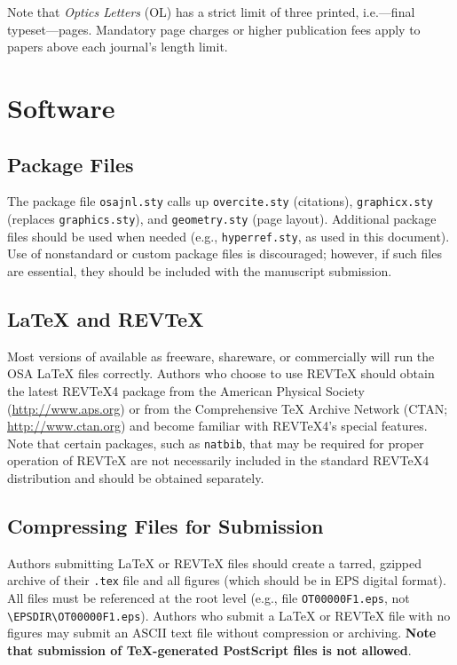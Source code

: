 \documentclass[letterpaper,12pt]{article}   %
\begin{document}
Note that \textit{Optics Letters} (OL) has a strict limit of
three printed, i.e.---final typeset---pages. Mandatory page
charges or higher publication fees apply to papers above each
journal's length limit.
\section{Software}
\subsection{Package Files}
The package file \texttt{osajnl.sty} calls up
\texttt{overcite.sty} (citations), \texttt{graphicx.sty} (replaces \texttt{graphics.sty}), and \texttt{geometry.sty} (page layout). Additional
package files should be used when needed (e.g.,
\texttt{hyperref.sty}, as used in this document). Use of
nonstandard or custom package files is discouraged; however, if
such files are essential, they should be included with the
manuscript submission.

\subsection{\LaTeX{} and REV\TeX} Most versions of \LaTeXe{}
available as freeware, shareware, or commercially will run the OSA
\LaTeX{} files correctly. Authors who choose to use REV\TeX{}
should obtain the latest REV\TeX{}4 package from the American
Physical Society (\url{http://www.aps.org}) or from the
Comprehensive \TeX{} Archive Network (CTAN;
\href{http://www.ctan.org}{http://www.ctan.org}) and become familiar with REV\TeX{}4's
special features. Note that certain packages, such as
\verb+natbib+, that may be required for proper operation of
REV\TeX{} are not necessarily included in the standard REV\TeX{}4
distribution and should be obtained separately.

\subsection{Compressing Files for Submission}
Authors submitting \LaTeX{} or REV\TeX{} files should create a
tarred, gzipped archive of their \texttt{.tex} file and all
figures (which should be in EPS digital format). All files must be
referenced at the root level (e.g., file {\tt OT00000F1.eps}, not
\verb+\EPSDIR\OT00000F1.eps+).  Authors who submit a \LaTeX{} or REV\TeX{} file
with no figures may submit an ASCII text file without compression
or archiving. {\bf Note that submission of \TeX-generated
PostScript files is not allowed}.
\end{document}
